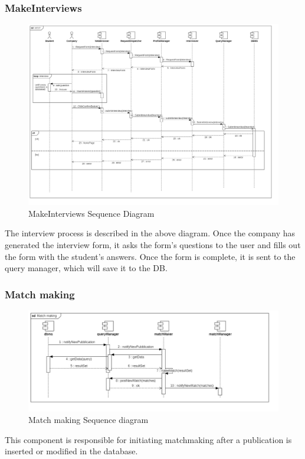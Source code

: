 \documentclass{article}
\begin{document}
\subsubsection{MakeInterviews}
\begin{figure}[H]
    \centering
    \includegraphics[width=1\linewidth]{SequenceDiagram/UC17.jpg}
    \caption{MakeInterviews  Sequence Diagram}
    \label{fig:enter-label}
\end{figure}
The interview process is described in the above diagram. Once the company has generated the interview form, it asks the form's questions to the user and fills out the form with the student's answers. Once the form is complete, it is sent to the query manager, which will save it to the DB.
    
\subsubsection{Match making}

\begin{figure}[H]
    \centering
    \includegraphics[width=1\linewidth]{SequenceDiagram/Match making.jpg}
    \caption{Match making Sequence diagram}
    \label{fig:enter-label}
\end{figure}
This component is responsible for initiating matchmaking after a publication is inserted or modified in the database.
\end{document}
